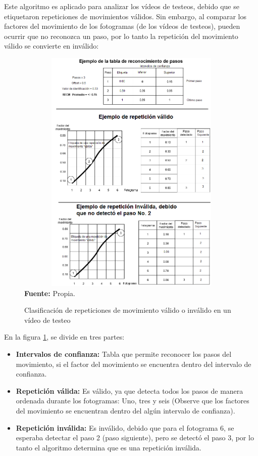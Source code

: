 Este algoritmo es aplicado para analizar los v\'ideos de testeos, debido que se etiquetaron  repeticiones de movimientos v\'alidos.  Sin embargo, al comparar los factores del movimiento de los fotogramas (de los v\'ideos de testeos), pueden ocurrir que no reconozca un paso, por lo tanto la repetici\'on del movimiento v\'alido se convierte en inv\'alido:
 \begin{figure}[H]
	\caption{Clasificaci\'on de repeticiones de movimiento v\'alido o inv\'alido  en un v\'ideo de testeo}
	\label{fig:detValido}
	\centering
	\includegraphics[width=430px,height=450px]{graphics/reconocimientoDePasos.png} \\
	\textbf{Fuente:} Propia.
\end{figure}
En la figura \ref{fig:detValido}, se divide en tres partes:
\begin{itemize}
\item \textbf{Intervalos de confianza:} Tabla que permite reconocer los pasos del movimiento, si el factor del movimiento se encuentra dentro del intervalo de confianza.
\item \textbf{Repetici\'on v\'alida:} Es v\'alido,  ya que detecta todos los pasos de manera ordenada  durante los fotogramas: Uno, tres y seis (Observe que los factores del movimiento se encuentran dentro del alg\'un intervalo de confianza). 
\item \textbf{Repetici\'on inv\'alida:} Es inv\'alido, debido que para el fotograma 6, se esperaba detectar el paso 2 (paso siguiente), pero se detect\'o el paso 3, por lo tanto el algoritmo determina que es una repetici\'on inv\'alida.
\end{itemize}
